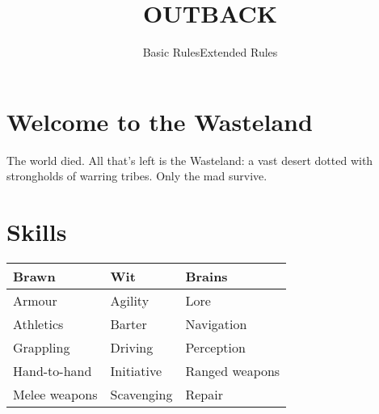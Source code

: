 \documentclass[10pt, a4paper, twocolumn]{article}
\title{\uppercase{Outback}}
\date{}
\begin{document}
\subtitle{Basic Rules}
\compacttitle

\section{Welcome to the Wasteland}
The world died. All that's left is the Wasteland: a vast desert dotted with strongholds of warring tribes. Only the mad survive.








\clearpage
\subtitle{Extended Rules}
\compacttitle

\section{Skills}
{\small\begin{tabular}{lll}
  Brawn         & Wit        & Brains         \\
  \hline
  Armour        & Agility    & Lore           \\
  Athletics     & Barter     & Navigation     \\
  Grappling     & Driving    & Perception     \\
  Hand-to-hand  & Initiative & Ranged weapons \\
  Melee weapons & Scavenging & Repair
\end{tabular}}
\end{document}
